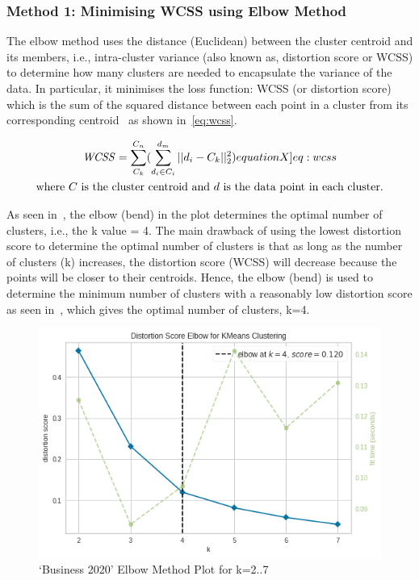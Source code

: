\subsubsection{Method 1: Minimising WCSS using Elbow Method}
The elbow method uses the distance (Euclidean) between the cluster centroid and its members, i.e., intra-cluster variance (also known as, distortion score or WCSS) to determine how many clusters are needed to encapsulate the variance of the data. In particular, it minimises the loss function: WCSS (or distortion score) which is the sum of the squared distance between each point in a cluster from its corresponding centroid~\cite{elbowvssil} as shown in~\ref{eq:wcss}.

\vspace{-2ex}
\begin{gather}
  \mathit{WCSS} =  \sum^{C_n}_{C_k} (\sum^{d_m}_{d_i \in C_i} || d_i - C_k ||_2^2) \label[equationX]{eq:wcss} \\
  \text{where~$C$ is the cluster centroid and~$d$ is the data point in each cluster.} \nonumber
\end{gather}

As seen in~, the elbow (bend) in the plot determines the optimal number of clusters, i.e., the k value = 4. The main drawback of using the lowest distortion score to determine the optimal number of clusters is that as long as the number of clusters (k) increases, the distortion score (WCSS) will decrease because the points will be closer to their centroids. Hence, the elbow (bend) is used to determine the minimum number of clusters with a reasonably low distortion score as seen in~, which gives the optimal number of clusters, k=4.

\begin{figure}[H]
\centering
\includegraphics[scale=0.4]{images/elbow.png}
\caption{`Business 2020' Elbow Method Plot for k=2..7}
\label{fig:elbow}
\end{figure}

